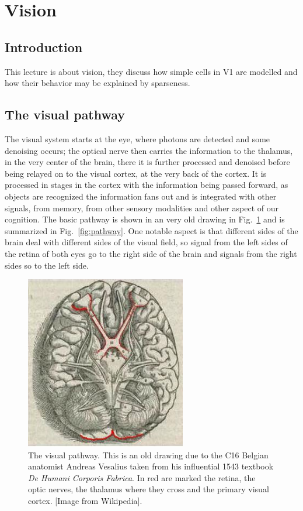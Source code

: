 \documentclass[11pt,a4paper]{scrartcl}
\begin{document}
\section*{Vision}

\subsection*{Introduction} 
This lecture is about vision, they discuss how simple cells in V1 are
modelled and how their behavior may be explained by sparseness.

\subsection*{The visual pathway}
The visual system starts at the eye, where photons are detected and
some denoising occurs; the optical nerve then carries the information
to the thalamus, in the very center of the brain, there it is further
processed and denoised before being relayed on to the visual cortex,
at the very back of the cortex. It is processed in stages in the
cortex with the information being passed forward, as objects are
recognized the information fans out and is integrated with other
signals, from memory, from other sensory modalities and other aspect
of our cognition. The basic pathway is shown in an very old drawing in
Fig.~\ref{fig:Fabrica} and is summarized in
Fig.~\ref{fig:pathway}. One notable aspect is that different sides of
the brain deal with different sides of the visual field, so signal
from the left sides of the retina of both eyes go to the right side of
the brain and signals from the right sides so to the left side.

\begin{figure}
\begin{center}
\includegraphics[width=7cm]{Fabrica_VisualSystem.jpg}
\end{center}
\caption{The visual pathway. This is an old drawing due to the C16
  Belgian anatomist Andreas Vesalius taken from his influential 1543
  textbook \textsl{De Humani Corporis Fabrica}. In red are marked the
  retina, the optic nerves, the thalamus where they cross and the
  primary visual cortex. [Image from Wikipedia].\label{fig:Fabrica}}
\end{figure}
\end{document}

